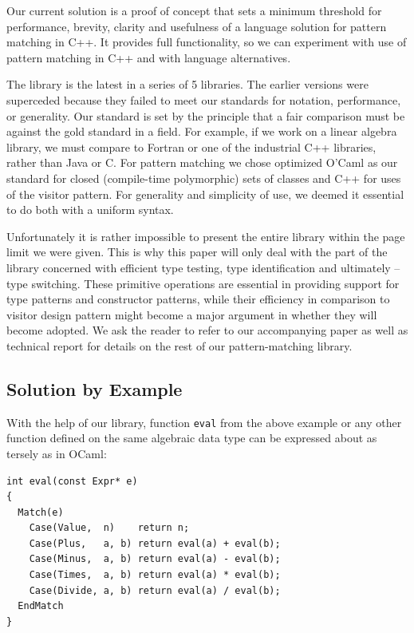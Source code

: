 \documentclass[preprint]{sigplanconf}
\makeatletter
\DeclareRobustCommand{\code}[1]{{\lstinline[breaklines=false,escapechar=@]{#1}}}
\makeatother
\begin{document}
Our current solution is a proof of concept that sets a minimum threshold for 
performance, brevity, clarity and usefulness of a language solution for pattern 
matching in C++. It provides full functionality, so we can experiment with use 
of pattern matching in C++ and with language alternatives. 

The library is the latest in a series of 5 libraries. The earlier versions were 
superceded because they failed to meet our standards for notation, performance, 
or generality. Our standard is set by the principle that a fair comparison must 
be against the gold standard in a field. For example, if we work on a linear 
algebra library, we must compare to Fortran or one of the industrial C++ 
libraries, rather than Java or C. For pattern matching we chose optimized O'Caml 
as our standard for closed (compile-time polymorphic) sets of classes and C++ 
for uses of the visitor pattern. For generality and simplicity of use, we deemed 
it essential to do both with a uniform syntax.

Unfortunately it is rather impossible to present the entire library within the 
page limit we were given. This is why this paper will only deal with the part of 
the library concerned with efficient type testing, type identification and 
ultimately -- type switching. These primitive operations are essential in 
providing support for type patterns and constructor patterns, while their 
efficiency in comparison to visitor design pattern might become a major argument 
in whether they will become adopted. We ask the reader to refer to our 
accompanying paper\cite{AP} as well as technical report\cite{TR} for details on 
the rest of our pattern-matching library.

\subsection{Solution by Example}
\label{sec:sbe}

With the help of our library, function \code{eval} from the above example or any 
other function defined on the same algebraic data type can be expressed about as 
tersely as in OCaml:

\begin{lstlisting}[keepspaces,columns=flexible]
int eval(const Expr* e)
{
  Match(e)
    Case(Value,  n)    return n;
    Case(Plus,   a, b) return eval(a) + eval(b);
    Case(Minus,  a, b) return eval(a) - eval(b);
    Case(Times,  a, b) return eval(a) * eval(b);
    Case(Divide, a, b) return eval(a) / eval(b);
  EndMatch
}
\end{lstlisting}
\end{document}
